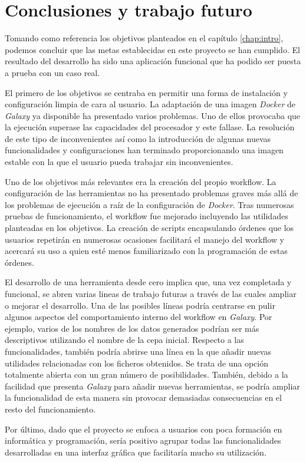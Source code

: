 \chapter{Conclusiones y trabajo futuro}
\label{chap:conclusiones}
Tomando como referencia los objetivos planteados en el capítulo \ref{chap:intro}, podemos concluir que las metas establecidas en este proyecto se han cumplido. El resultado del desarrollo ha sido una aplicación funcional que ha podido ser puesta a prueba con un caso real.

El primero de los objetivos se centraba en permitir una forma de instalación y configuración limpia de cara al usuario. La adaptación de una imagen \textit{Docker} de \textit{Galaxy} ya disponible ha presentado varios problemas. Uno de ellos provocaba que la ejecución superase las capacidades del procesador y este fallase. La resolución de este tipo de inconvenientes así como la introducción de algunas nuevas funcionalidades y configuraciones han terminado proporcionando una imagen estable con la que el usuario pueda trabajar sin inconvenientes.

Uno de los objetivos más relevantes era la creación del propio workflow. La configuración de las herramientas no ha presentado problemas graves más allá de los problemas de ejecución a raíz de la configuración de \textit{Docker}. Tras numerosas pruebas de funcionamiento, el workflow fue mejorado incluyendo las utilidades planteadas en los objetivos. La creación de scripts encapsulando órdenes que los usuarios repetirán en numerosas ocasiones facilitará el manejo del workflow y acercará su uso a quien esté menos familiarizado con la programación de estas órdenes.

El desarrollo de una herramienta desde cero implica que, una vez completada y funcional, se abren varias lineas de trabajo futuras a través de las cuales ampliar o mejorar el desarrollo. Una de las posibles líneas podría centrarse en pulir algunos aspectos del comportamiento interno del workflow en \textit{Galaxy}. Por ejemplo, varios de los nombres de los datos generados podrían ser más descriptivos utilizando el nombre de la cepa inicial. Respecto a las funcionalidades, también podría abrirse una línea en la que añadir nuevas utilidades relacionadas con los ficheros obtenidos. Se trata de una opción totalmente abierta con un gran número de posibilidades. También, debido a la facilidad que presenta \textit{Galaxy} para añadir nuevas herramientas, se podría ampliar la funcionalidad de esta manera sin provocar demasiadas consecuencias en el resto del funcionamiento.

Por último, dado que el proyecto se enfoca a usuarios con poca formación en informática y programación, sería positivo agrupar todas las funcionalidades desarrolladas en una interfaz gráfica que facilitaría mucho su utilización.

\newpage \thispagestyle{empty} %